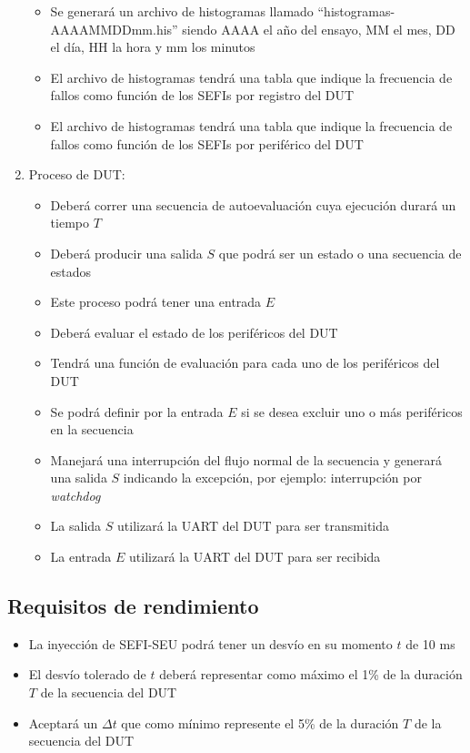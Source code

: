 \documentclass[
11pt, %
]{charter}
\begin{document}
\begin{enumerate}
\begin{itemize}
		\item Se generará un archivo de histogramas llamado ``histogramas-AAAAMMDDmm.his'' siendo AAAA el año del ensayo, MM el mes, DD el día, HH la hora y mm los minutos
		\item El archivo de histogramas tendrá una tabla que indique la frecuencia de fallos como función de los SEFIs por registro del DUT
		\item El archivo de histogramas tendrá una tabla que indique la frecuencia de fallos como función de los SEFIs por periférico del DUT
	\end{itemize}
	\item Proceso de DUT:
	\begin{itemize}
		\item Deberá correr una secuencia de autoevaluación cuya ejecución durará un tiempo $ T $
		\item Deberá producir una salida $ S $ que podrá ser un estado o una secuencia de estados
		\item Este proceso podrá tener una entrada $ E $
		\item Deberá evaluar el estado de los periféricos del DUT
		\item Tendrá una función de evaluación para cada uno de los periféricos del DUT
		\item Se podrá definir por la entrada $ E $ si se desea excluir uno o más periféricos en la secuencia
		\item Manejará una interrupción del flujo normal de la secuencia y generará una salida $ S $ indicando la excepción, por ejemplo: interrupción por \emph{watchdog}
		\item La salida $ S $ utilizará la UART del DUT para ser transmitida
		\item La entrada $ E $ utilizará la UART del DUT para ser recibida
	\end{itemize}
\end{enumerate}

\subsection{Requisitos de rendimiento}
\label{sub:rendimiento}

\begin{itemize}
	\item La inyección de SEFI-SEU podrá tener un desvío en su momento $ t $ de 10 ms
	\item El desvío tolerado de $ t $ deberá representar como máximo el 1\% de la duración $ T $ de la secuencia del DUT
	\item Aceptará un $ \Delta t $ que como mínimo represente el 5\% de la duración $ T $ de la secuencia del DUT
\end{itemize}
\end{document}

